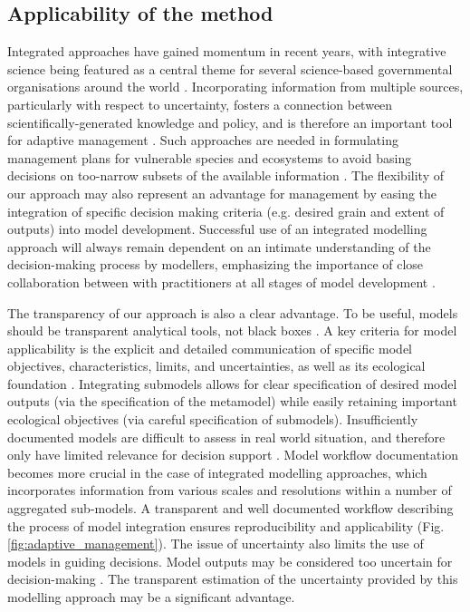 \subsection*{Applicability of the method}
Integrated approaches have gained momentum in recent years, with integrative science being featured as a central theme for several science-based governmental organisations around the world \citep[e.g.][]{Bernier2013}. 
Incorporating information from multiple sources, particularly with respect to uncertainty,  fosters a connection between scientifically-generated knowledge and policy, and is therefore an important tool for adaptive management \citep[][Fig. \ref{fig:adaptive_management}]{Rehme2011}.
Such approaches are needed in formulating management plans for vulnerable species and ecosystems to avoid basing decisions on too-narrow subsets of the available information \citep{Dawson2011}.
The flexibility of our approach may also represent an advantage for management by easing the integration of specific decision making criteria (e.g. desired grain and extent of outputs) into model development. 
Successful use of an integrated modelling approach will always remain dependent on an intimate understanding of the decision-making process by modellers, emphasizing the importance of close collaboration between with practitioners at all stages of model development \citep{Guisan2013}.

The transparency of our approach is also a clear advantage. 
To be useful, models should be transparent analytical tools, not black boxes \citep{Addison2013}. 
A key criteria for model applicability is the explicit and detailed communication of specific model objectives, characteristics, limits, and uncertainties, as well as its ecological foundation \citep{Guisan2013}.
Integrating submodels allows for clear specification of desired model outputs (via the specification of the metamodel) while easily retaining important ecological objectives (via careful specification of submodels).
Insufficiently documented models are difficult to assess in real world situation, and therefore only have limited relevance for decision support \citep{Guisan2013}.
Model workflow documentation becomes more crucial in the case of integrated modelling approaches, which incorporates information from various scales and resolutions within a number of aggregated sub-models. 
A transparent and well documented workflow describing the process of model integration ensures reproducibility and applicability (Fig. \ref{fig:adaptive_management}). 
The issue of uncertainty also limits the use of models in guiding decisions. 
Model outputs may be considered too uncertain for decision-making \citep{Addison2013}. 
The transparent estimation of the uncertainty provided by this modelling approach may be a significant advantage. 

